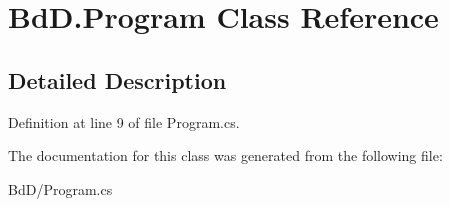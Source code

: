 \hypertarget{class_bd_d_1_1_program}{}\section{Bd\+D.\+Program Class Reference}
\label{class_bd_d_1_1_program}


\subsection{Detailed Description}


Definition at line 9 of file Program.\+cs.



The documentation for this class was generated from the following file\+:\begin{DoxyCompactItemize}
\item 
Bd\+D/Program.\+cs\end{DoxyCompactItemize}
